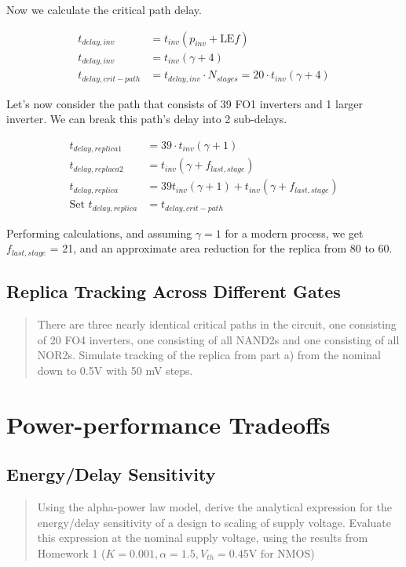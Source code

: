 \documentclass[11pt]{article}
\begin{document}
Now we calculate the critical path delay.

\begin{align}
	t_{delay,inv} &= t_{inv}(p_{inv} + \text{LE} f) \nonumber \\
	t_{delay,inv} &= t_{inv}(\gamma + 4) \nonumber \\
	t_{delay,crit-path} &= t_{delay,inv}  \cdot N_{stages} = 20 \cdot t_{inv}(\gamma + 4) \nonumber
\end{align}

Let's now consider the path that consists of 39 FO1 inverters and 1 larger inverter. We can break this path's delay into 2 sub-delays.

\begin{align}
	t_{delay,replica1} &= 39 \cdot t_{inv}(\gamma + 1) \nonumber \\
	t_{delay,replaca2} &= t_{inv}(\gamma + f_{last,stage}) \nonumber \\
	t_{delay,replica} &= 39 t_{inv}(\gamma + 1) + t_{inv}(\gamma + f_{last,stage}) \nonumber \\
	\text{Set } t_{delay,replica} &= t_{delay,crit-path} \nonumber 
\end{align}

Performing calculations, and assuming $\gamma = 1$ for a modern process, we get $f_{last,stage}$ = 21, and an approximate area reduction for the replica from 80 to 60.

\subsection{Replica Tracking Across Different Gates}
\begin{quote}
	There are three nearly identical critical paths in the circuit, one consisting of 20 FO4 inverters, one consisting of all NAND2s and one consisting of all NOR2s. Simulate tracking of the replica from part a) from the nominal down to 0.5V with 50 mV steps.
\end{quote}

\section{Power-performance Tradeoffs}

\subsection{Energy/Delay Sensitivity}
\begin{quote}
	Using the alpha-power law model, derive the analytical expression for the energy/delay sensitivity of a design to scaling of supply voltage. Evaluate this expression at the nominal supply voltage, using the results from Homework 1 ($K = 0.001, \alpha = 1.5, V_{th} = 0.45 \text{V for NMOS}$)
\end{quote}
\end{document}

